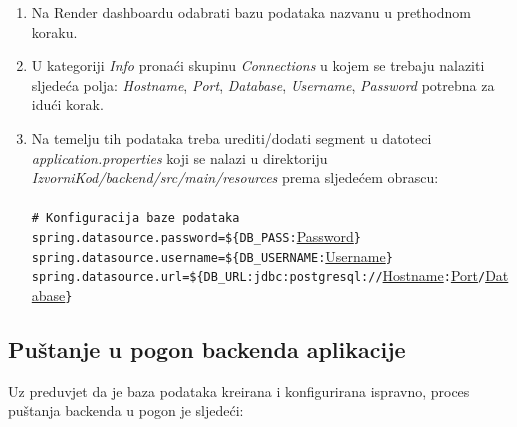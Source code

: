 \begin{enumerate}
	\item Na Render dashboardu odabrati bazu podataka nazvanu u prethodnom koraku.
	\item U kategoriji \textit{Info} pronaći skupinu \textit{Connections} u kojem se trebaju nalaziti sljedeća polja: \textit{Hostname}, \textit{Port}, \textit{Database}, \textit{Username}, \textit{Password} potrebna za idući korak.
	\item Na temelju tih podataka treba urediti/dodati segment u datoteci \textit{application.properties} koji se nalazi u direktoriju \textit{IzvorniKod/backend/src/main/resources} prema sljedećem obrascu:\\
	      \\
	      \verb+# Konfiguracija baze podataka+\\
	      \verb+spring.datasource.password=${DB_PASS:+\underline{\textlangle Password\textrangle}\verb+}+\\
	      \verb+spring.datasource.username=${DB_USERNAME:+\underline{\textlangle Username\textrangle}\verb+}+\\
	      \verb+spring.datasource.url=${DB_URL:jdbc:postgresql://+\underline{\textlangle Hostname\textrangle}\verb+:+\underline{\textlangle Port\textrangle}\verb+/+\underline{\textlangle Database\textrangle}\verb+}+
\end{enumerate}

\subsection{Puštanje u pogon backenda aplikacije}

Uz preduvjet da je baza podataka kreirana i konfigurirana ispravno, proces puštanja backenda u pogon je sljedeći:

